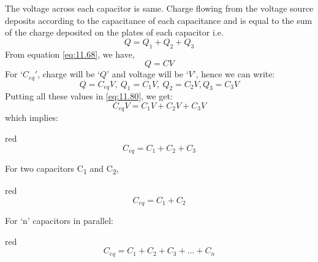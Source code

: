 The voltage across each capacitor is same. Charge flowing from the voltage
source deposits according to the capacitance of each capacitance and is equal to
the sum of the charge deposited on the plates of each capacitor i.e.
\begin{equation}\label{eq:11.80}
  Q = Q_{1} + Q_{2} + Q_{3}
\end{equation}
From equation \ref{eq:11.68}, we have,
\begin{equation}\nonumber
  Q =  CV
\end{equation}
For `$C_{eq}'$, charge will be `$Q$' and voltage will be `$V$', hence we can write:
\begin{equation}\nonumber
  Q = C_{eq}V,\:Q_{1} = C_{1}V,\:Q_{2} = C_{2}V, Q_{3} = C_{3}V
\end{equation}
Putting all these values in \ref{eq:11.80}, we get:
\begin{equation}\nonumber
  C_{eq}V = C_{1}V + C_{2}V + C_{3}V
\end{equation}
which implies:
\begin{mybox}{red}{}
  \begin{equation}\label{eq:11.81}
    C_{eq} = C_{1} + C_{2} +C_{3}
  \end{equation}
\end{mybox}
\noindent For two capacitors C\textsubscript{1} and C\textsubscript{2}, 
\begin{mybox}{red}{}
  \begin{equation}\label{eq:11.82}
    C_{eq} = C_{1} + C_{2}
  \end{equation}
\end{mybox}
\noindent For `n' capacitors in parallel:
\begin{mybox}{red}{}
  \begin{equation}\label{eq:11.83}
    C_{eq} = C_{1} + C_{2} + C_{3} +...+C_{n}
  \end{equation}
\end{mybox}

